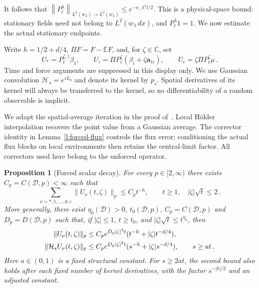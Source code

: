 \documentclass[11pt]{amsart}
\newtheorem{proposition}{Proposition}[section]
\theoremstyle{definition}
\theoremstyle{remark}
\numberwithin{equation}{section}
\newcommand{\E}{\mathbb E}
\renewcommand{\a}{\mathbf a}
\newcommand{\C}{\mathbb C}
\newcommand{\norm}[1]{\left\|#1\right\|}
\begin{document}
It follows that $\norm{P_t^\lambda}_{L^2(w_\lambda)\to L^2(w_\lambda)}\leq e^{-a_-\lambda^2t/2}$. This is a physical-space bound: stationary fields need not belong to $L^2(w_\lambda\,dx)$, and $P_t^\lambda1=1$. We now estimate the actual stationary endpoints.

Write $h=1/2+d/4$, $\Pi F=F-\E F$, and, for $\zeta\in\C$, set
\begin{equation*}
 U_*=P_t^{\zeta,\dagger}\beta_1,\qquad
 U_i=\Pi P_t^\zeta(\beta_i+\zeta \a_{1i}),\qquad
 U_c=\zeta\Pi P_t^\zeta\mu\, .
\end{equation*}
Time and force arguments are suppressed in this display only. We use Gaussian convolution $\mathcal H_s=e^{s\overline L_0}$ and denote its kernel by $\overline p_s$. Spatial derivatives of its kernel will always be transferred to the kernel, so no differentiability of a random observable is implicit.

We adapt the spatial-average iteration in the proof of~\citet[Theorem~9.1]{AKM2019book}. Local H\"older interpolation recovers the point value from a Gaussian average. The corrector identity in Lemma~\ref{l:forced-flux} controls the flux error; conditioning the actual flux blocks on local environments then retains the central-limit factor. All correctors used here belong to the unforced operator.

\begin{proposition}[Forced scalar decay]\label{p:scalar}
For every $p\in[2,\infty)$ there exists $C_p=C(\mathcal D,p)<\infty$ such that
\begin{equation}\label{e:scalar-target}
 \sum_{\nu=*,1,\ldots,d,c}\|U_\nu(t,\zeta)\|_p
 \leq C_p t^{-h},\qquad t\geq1,\quad |\zeta|\sqrt t\leq2\, .
\end{equation}
More generally, there exist $\eta_0(\mathcal D)>0$, $t_0(\mathcal D,p)$, $C_p=C(\mathcal D,p)$ and $D_p=D(\mathcal D,p)$ such that, if $|\zeta|\leq1$, $t\geq t_0$, and $|\zeta|\sqrt t\leq t^{\eta_0}$, then
\begin{align}\label{e:scalar-wide}
 \|U_\nu(t,\zeta)\|_p
 &\leq C_p e^{D_p|\zeta|^2t}
       (t^{-h}+|\zeta|t^{-d/4}),\notag\\
 \|\mathcal H_sU_\nu(t,\zeta)\|_p
 &\leq C_p e^{D_p|\zeta|^2t}
       (s^{-h}+|\zeta|s^{-d/4}),\qquad s\geq a t\, .
\end{align}
Here $a\in(0,1)$ is a fixed structural constant. For $s\geq2at$, the second bound also holds after each fixed number of kernel derivatives, with the factor $s^{-|k|/2}$ and an adjusted constant.
\end{proposition}
\end{document}
